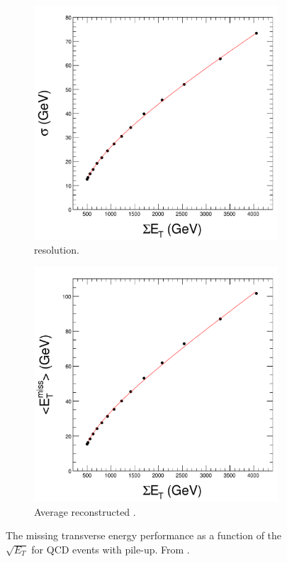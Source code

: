 \begin{figure}[htbp]
  \centering
  \begin{subfigure}{0.48\textwidth}
    \centering
    \includegraphics[width=\textwidth]{met_res}
    \caption{\ETm resolution.}
    \label{fig:met_res}
  \end{subfigure}
  \begin{subfigure}{0.48\textwidth}
    \centering
    \includegraphics[width=\textwidth]{met_mean}
    \caption{Average reconstructed \ETm.}
    \label{fig:met_mean}
  \end{subfigure}
  \caption{ The missing transverse energy performance as a function of the
           $\sqrt{E_T}$ for QCD events with pile-up. From \cite{chatrchyan2008cms}. }
  \label{fig:met_performance} 
\end{figure}

